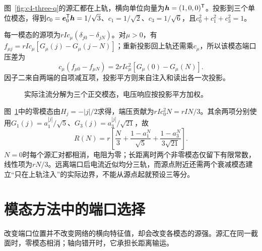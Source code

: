\begin{solution}
图~\ref{fig:c4-three-q}的源汇都在上轨，横向单位向量为$\bm{h}=(1,0,0)^{\mathsf T}$。投影到三个单位模态，得到$c_0=\bm{e}_0^{\mathsf T}\bm{h}=1/\sqrt3$、$c_1=1/\sqrt2$、$c_3=1/\sqrt6$，且$c_0^2+c_1^2+c_3^2=1$。

每一模态的源项为$rIc_\mu(\delta_{j0}-\delta_{jN})$。对$\mu>0$，有$f_{\mu j}=rIc_\mu[G_\mu(j)-G_\mu(j-N)]$；重新投影回上轨还需乘$c_\mu$，所以该模态端口压差为
\[
 c_\mu(f_{\mu0}-f_{\mu N})
 =2rI c_\mu^2[G_\mu(0)-G_\mu(N)].
\]
因子二来自两端的自项减互项，投影平方则来自注入和读出各一次投影。
\begin{figure}[H]\centering
{}
\caption{实际注流分解为三个正交模态，电压响应按投影平方加权。}\label{fig:c4-three-s}
\end{figure}
图~\ref{fig:c4-three-s}中的零模态由$H_j=-|j|/2$求得，端压贡献为$rIc_0^2N=rIN/3$。其余两项分别使用$G_1(j)=a_1^{|j|}/\sqrt5$、$G_3(j)=a_3^{|j|}/\sqrt{21}$，故
\[
 \boxed{R(N)=r\left[\frac N3+
 \frac{1-a_1^N}{\sqrt5}+\frac{1-a_3^N}{3\sqrt{21}}\right]}.
\]
$N=0$时每个源汇对都相消，电阻为零；长距离时两个非零模态仅留下有限常数，线性项为$rN/3$。远离端口后电流近似均分三轨，而源点附近还需两个衰减模态建立“只在上轨注入”的实际边界，不能从源点起就预设三等分。
\end{solution}


\section{模态方法中的端口选择}
改变端口位置并不改变网络的横向特征值，却会改变各模态的源强。源汇在同一截面时，零模态相消；轴向错开时，它承担长距离输运。


